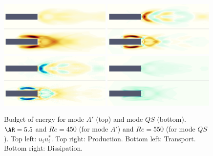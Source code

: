 \begin{figure}
  \centering
  \includegraphics[width=0.49\textwidth]{./fig/AR5s/Ener_AR5p5_Re450_Re550_beta2.png}
  \includegraphics[width=0.49\textwidth]{./fig/AR5s/Prod_AR5p5_Re450_Re550_beta2.png}
  \includegraphics[width=0.49\textwidth]{./fig/AR5s/Trsp_AR5p5_Re450_Re550_beta2.png}
  \includegraphics[width=0.49\textwidth]{./fig/AR5s/Diss_AR5p5_Re450_Re550_beta2.png}
  \caption{Budget of energy for mode $A'$ (top) and mode $QS$ (bottom). $\AR=5.5$ and $Re=450$ (for mode $A'$) and $Re=550$ (for mode $QS$). Top left: $u_i u_i^*$. Top right: Production. Bottom left: Transport. Bottom right: Dissipation.}
  \label{fig:budget_ener}
\end{figure}
